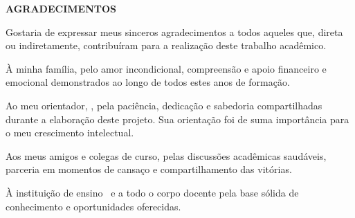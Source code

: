 
\begin{center}
  \textbf{AGRADECIMENTOS}
\end{center}

\vspace{1cm}

Gostaria de expressar meus sinceros agradecimentos a todos aqueles que, direta ou indiretamente, contribuíram para a realização deste trabalho acadêmico.

À minha família, pelo amor incondicional, compreensão e apoio financeiro e emocional demonstrados ao longo de todos estes anos de formação.

Ao meu orientador, \meuorientador, pela paciência, dedicação e sabedoria compartilhadas durante a elaboração deste projeto. Sua orientação foi de suma importância para o meu crescimento intelectual.

Aos meus amigos e colegas de curso, pelas discussões acadêmicas saudáveis, parceria em momentos de cansaço e compartilhamento das vitórias.

À instituição de ensino \minhainstituicao\ e a todo o corpo docente pela base sólida de conhecimento e oportunidades oferecidas.
